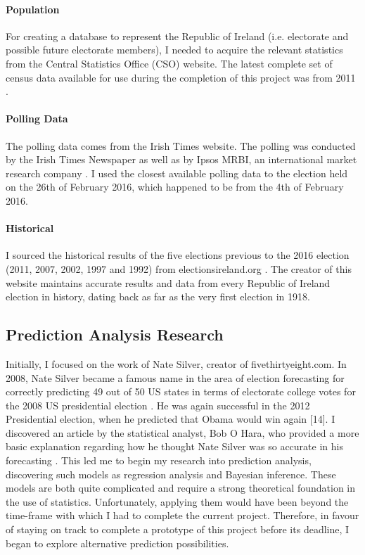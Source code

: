 \paragraph{Population}
For creating a database to represent the Republic of Ireland (i.e. electorate and possible future electorate members), I needed to acquire the relevant statistics from the Central Statistics Office (CSO) website. The latest complete set of census data available for use during the completion of this project was from 2011 \cite{cso}. 
\paragraph{Polling Data}
The polling data comes from the Irish Times website. The polling was conducted by the Irish Times Newspaper as well as by Ipsos MRBI, an international market research company \cite{irishtimes}. I used the closest available polling data to the election held on the 26th of February 2016, which happened to be from the 4th of February 2016.
\paragraph{Historical}
I sourced the historical results of the five elections previous to the 2016 election (2011, 2007, 2002, 1997 and 1992) from electionsireland.org \cite{electionireland}. The creator of this website maintains accurate results and data from every Republic of Ireland election in history, dating back as far as the very first election in 1918.  
\subsection{Prediction Analysis Research}
Initially, I focused on the work of Nate Silver, creator of fivethirtyeight.com. In 2008, Nate Silver became a famous name in the area of election forecasting for correctly predicting 49 out of 50 US states in terms of electorate college votes for the 2008 US presidential election \cite{natenytimes}. He was again successful in the 2012 Presidential election, when he predicted that Obama would win again [14]. I discovered an article by the statistical analyst, Bob O Hara, who provided a more basic explanation regarding how he thought Nate Silver was so accurate in his forecasting \cite{bobohara}. This led me to begin my research into prediction analysis, discovering such models as regression analysis and Bayesian inference. These models are both quite complicated and require a strong theoretical foundation in the use of statistics. Unfortunately, applying them would have been beyond the time-frame with which I had to complete the current project. Therefore, in favour of staying on track to complete a prototype of this project before its deadline, I began to explore alternative prediction possibilities.
 
